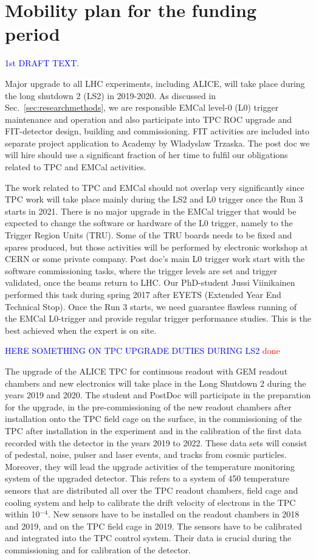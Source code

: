 \section{Mobility plan for the funding period}%
\label{sec:mobility}

\textcolor{blue}{1st DRAFT TEXT.}

Major upgrade to all LHC experiments, including ALICE, will take place during the long shutdown 2 (LS2) in 2019-2020. As discussed in Sec.~\ref{sec:researchmethods}, we are responsible EMCal level-0 (L0) trigger maintenance and operation and also participate into TPC ROC upgrade and FIT-detector design, building and commissioning. FIT activities are included into separate project application to Academy by Wladyslaw Trzaska. The post doc we will hire should use a significant fraction of her time to fulfil our obligations related to TPC and EMCal activities.

The work related to TPC and EMCal should not overlap very significantly since TPC work will take place mainly during the LS2 and L0 trigger once the Run 3 starts in 2021. There is no major upgrade in the EMCal trigger that would be expected to change the software or hardware of the L0 trigger, namely to the Trigger Region Units (TRU). Some of the TRU boards needs to be fixed and spares produced, but those activities will be performed by electronic workshop at CERN or some private company. Post doc’s main L0 trigger work start with the software commissioning tasks, where the trigger levels are set and trigger validated, once the beams return to LHC. Our PhD-student Jussi Viinikainen performed this task during spring 2017 after EYETS (Extended Year End Technical Stop). Once the Run 3 starts, we need guarantee flawless running of the EMCal L0-trigger and provide regular trigger performance studies. This is the best achieved when the expert is on site.

\textcolor{blue}{HERE SOMETHING ON TPC UPGRADE DUTIES DURING LS2}
\textcolor{red}{done}

The upgrade of the ALICE TPC for continuous readout with GEM readout chambers and new electronics will take place in the Long Shutdown 2 during the years 2019 and 2020. The student and PostDoc will participate in the preparation for the upgrade, in the pre-commissioning of the new readout chambers after installation onto the TPC field cage on the surface, in the commissioning of the TPC after installation in the experiment and in the calibration of the first data recorded with the detector in the years 2019 to 2022. These data sets will consist of pedestal, noise, pulser and laser events, and tracks from cosmic particles. Moreover, they will lead the upgrade activities of the temperature monitoring system of the upgraded detector. This refers to a system of 450 temperature sensors that are distributed all over the TPC readout chambers, field cage and cooling system and help to calibrate the drift velocity of electrons in the TPC within 10$^{-4}$. New sensors have to be installed on the readout chambers in 2018 and 2019, and on the TPC field cage in 2019. The sensors have to be calibrated and integrated into the TPC control system. Their data is crucial during the commissioning and for calibration of the detector.

